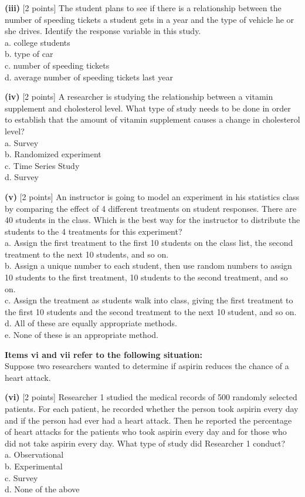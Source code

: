 \documentclass[11pt]{isuthesis}\usepackage[]{graphicx}\usepackage[]{color}
\begin{document}
\begin{appendices}
\noindent\textbf{(iii)} [2 points] The student plans to see if there is a relationship between the number of speeding tickets a student gets in a year and the type of vehicle he or she drives. Identify the response variable in this study. \\
\indent a. college students \\
\indent b. type of car \\
\indent c. number of speeding tickets \\
\indent d. average number of speeding tickets last year 

\noindent\textbf{(iv)} [2 points] A researcher is studying the relationship between a vitamin supplement and cholesterol level. What type of study needs to be done in order to establish that the amount of vitamin supplement causes a change in cholesterol level? \\
\indent a. Survey \\
\indent b. Randomized experiment \\
\indent c. Time Series Study \\
\indent d. Survey 

\noindent\textbf{(v)} [2 points] An instructor is going to model an experiment in his statistics class by comparing the effect of 4 different treatments on student responses. There are 40 students in the class. Which is the best way for the instructor to distribute the students to the 4 treatments for this experiment? \\ 
\indent a. Assign the first treatment to the first 10 students on the class list, the second treatment to the next 10 students, and so on. \\
\indent b. Assign a unique number to each student, then use random numbers to assign 10 students to the first treatment, 10 students to the second treatment, and so on. \\
\indent c. Assign the treatment as students walk into class, giving the first treatment to the first 10 students and the second treatment to the next 10 student, and so on. \\
\indent d. All of these are equally appropriate methods. \\
\indent e. None of these is an appropriate method.

\textbf{Items vi and vii refer to the following situation:}\\
Suppose two researchers wanted to determine if aspirin reduces the chance of a heart attack.

\noindent\textbf{(vi)} [2 points] Researcher 1 studied the medical records of 500 randomly selected patients. For each patient, he recorded whether the person took aspirin every day and if the person had ever had a heart attack. Then he reported the percentage of heart attacks for the patients who took aspirin every day and for those who did not take aspirin every day. What type of study did Researcher 1 conduct? \\ 
\indent a. Observational \\
\indent b. Experimental \\
\indent c. Survey \\
\indent d. None of the above


\end{appendices}
\end{document}
